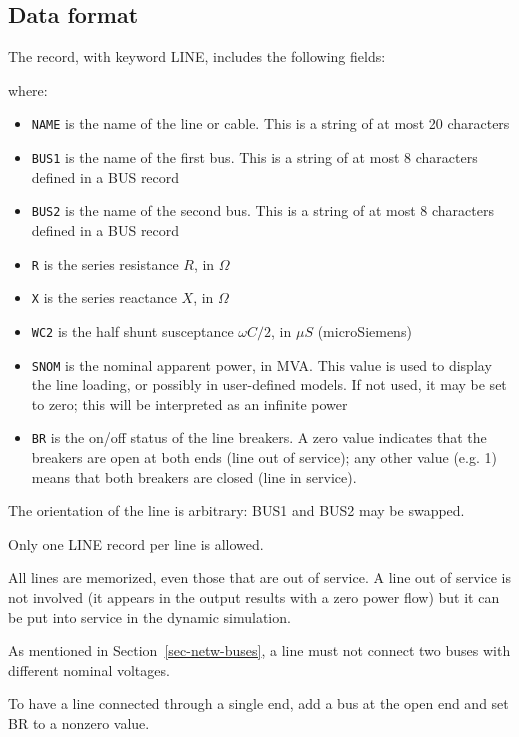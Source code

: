 \subsection{Data format}

The record, with keyword LINE, includes the following fields:

\hspace*{5ex}{\tt LINE NAME BUS1 BUS2 R X WC2 SNOM BR ;}

where:
\begin{itemize}
\item {\tt NAME} is the name of the line or cable. This is a string of at most 20 characters
\item {\tt BUS1} is the name of the first bus. This is a string of at most 8 characters defined in a BUS record
\item {\tt BUS2} is the name of the second bus. This is a string of at most 8 characters defined in a BUS record
\item {\tt R} is the series resistance $R$, in $\Omega$
\item {\tt X} is the series reactance $X$, in $\Omega$
\item {\tt WC2} is the half shunt susceptance ${\omega}C/2$, in ${\mu}S$ (microSiemens)
\item {\tt SNOM} is the nominal apparent power, in MVA. This value is used to display the line loading, or possibly in user-defined models. If not used, it may be set to zero; this will be interpreted as an infinite power
\item {\tt BR} is the on/off status of the line breakers. A zero value indicates that the breakers are open at both ends (line out of service); any other value (e.g. 1) means that both breakers are closed (line in service).
\end{itemize}

The orientation of the line is arbitrary: BUS1 and BUS2 may be swapped.

Only one LINE record per line is allowed.

All lines are memorized, even those that are out of service. A line out of service is not involved (it appears in the output results with a zero power flow) but it can be put into service in the dynamic simulation.

As mentioned in Section~\ref{sec-netw-buses}, a line must not connect two buses with different nominal voltages.

To have a line connected through a single end, add a bus at the open end and set BR to a nonzero value.

